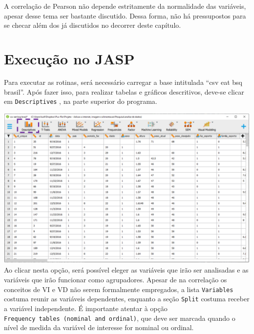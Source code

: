 \documentclass[
]{book}
\begin{document}
A correlação de Pearson não depende estritamente da normalidade das variáveis, apesar desse tema ser bastante discutido. Dessa forma, não há pressupostos para se checar além dos já discutidos no decorrer deste capítulo.

\hypertarget{execuuxe7uxe3o-no-jasp-14}{%
\section{Execução no JASP}\label{execuuxe7uxe3o-no-jasp-14}}

Para executar as rotinas, será necessário carregar a base intitulada ``csv eat bsq brasil''. Após fazer isso, para realizar tabelas e gráficos descritivos, deve-se clicar em \texttt{Descriptives} , na parte superior do programa.

\includegraphics{./img/cap_correlacao_descritivo.png}
Ao clicar nesta opção, será possível eleger as variáveis que irão ser analisadas e as variáveis que irão funcionar como agrupadores. Apesar de na correlação os conceitos de VI e VD não serem formalmente empregados, a lista \texttt{Variables} costuma reunir as variáveis dependentes, enquanto a seção \texttt{Split} costuma receber a variável independente. É importante atentar à opção \texttt{Frequency\ tables\ (nominal\ and\ ordinal)}, que deve ser marcada quando o nível de medida da variável de interesse for nominal ou ordinal.
\end{document}
